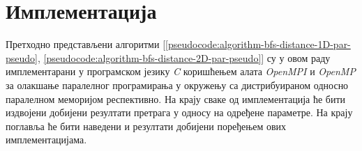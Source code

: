 \chapter{Имплементација}
Претходно представљени алгоритми [\ref{pseudocode:algorithm-bfs-distance-1D-par-pseudo}, \ref{pseudocode:algorithm-bfs-distance-2D-par-pseudo}] су у овом раду имплементарани у програмском језику \textit{C} коришћењем алата \textit{OpenMPI} и \textit{OpenMP} за олакшање паралелног програмирања у окружењу са дистрибуираном односно паралелном меморијом респективно. На крају сваке од имплементација ће бити издвојени добијени резултати претрага у односу на одређене параметре. На крају поглавља ће бити наведени и резултати добијени поређењем ових имплементацијама.







%



